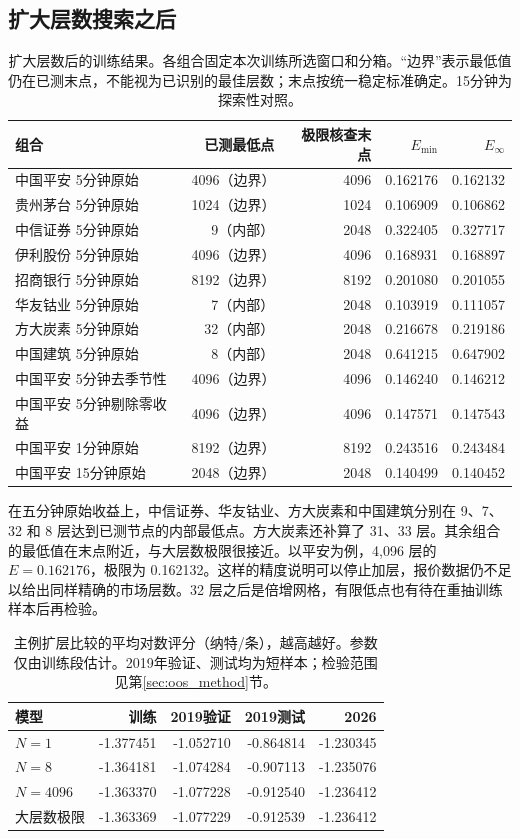 \documentclass[11pt,a4paper]{article}
\begin{document}
\clearpage
\subsection{扩大层数搜索之后}
\begin{table}[H]\centering\small
\caption{扩大层数后的训练结果。各组合固定本次训练所选窗口和分箱。“边界”表示最低值仍在已测末点，不能视为已识别的最佳层数；末点按统一稳定标准确定。15分钟为探索性对照。}\label{tab:depth_panel}
\begin{tabular}{lrrrr}\toprule
组合 & 已测最低点 & 极限核查末点 & $E_{\min}$ & $E_\infty$\\\midrule
中国平安 5分钟原始 & 4096（边界） & 4096 & 0.162176 & 0.162132\\
贵州茅台 5分钟原始 & 1024（边界） & 1024 & 0.106909 & 0.106862\\
中信证券 5分钟原始 & 9（内部） & 2048 & 0.322405 & 0.327717\\
伊利股份 5分钟原始 & 4096（边界） & 4096 & 0.168931 & 0.168897\\
招商银行 5分钟原始 & 8192（边界） & 8192 & 0.201080 & 0.201055\\
华友钴业 5分钟原始 & 7（内部） & 2048 & 0.103919 & 0.111057\\
方大炭素 5分钟原始 & 32（内部） & 2048 & 0.216678 & 0.219186\\
中国建筑 5分钟原始 & 8（内部） & 2048 & 0.641215 & 0.647902\\
中国平安 5分钟去季节性 & 4096（边界） & 4096 & 0.146240 & 0.146212\\
中国平安 5分钟剔除零收益 & 4096（边界） & 4096 & 0.147571 & 0.147543\\
中国平安 1分钟原始 & 8192（边界） & 8192 & 0.243516 & 0.243484\\
中国平安 15分钟原始 & 2048（边界） & 2048 & 0.140499 & 0.140452\\
\bottomrule\end{tabular}

\end{table}
在五分钟原始收益上，中信证券、华友钴业、方大炭素和中国建筑分别在 9、7、32 和 8 层达到已测节点的内部最低点。方大炭素还补算了 31、33 层。其余组合的最低值在末点附近，与大层数极限很接近。以平安为例，4,096 层的 $E=0.162176$，极限为 0.162132。这样的精度说明可以停止加层，报价数据仍不足以给出同样精确的市场层数。32 层之后是倍增网格，有限低点也有待在重抽训练样本后再检验。
\begin{table}[H]\centering\small
\caption{主例扩层比较的平均对数评分（纳特/条），越高越好。参数仅由训练段估计。2019年验证、测试均为短样本；检验范围见第\ref{sec:oos_method}节。}\label{tab:depth_scores}
\begin{tabular}{lrrrr}\toprule
模型 & 训练 & 2019验证 & 2019测试 & 2026\\\midrule
$N=1$ & -1.377451 & -1.052710 & -0.864814 & -1.230345\\
$N=8$ & -1.364181 & -1.074284 & -0.907113 & -1.235076\\
$N=4096$ & -1.363370 & -1.077228 & -0.912540 & -1.236412\\
大层数极限 & -1.363369 & -1.077229 & -0.912539 & -1.236412\\
\bottomrule\end{tabular}

\end{table}
\end{document}
